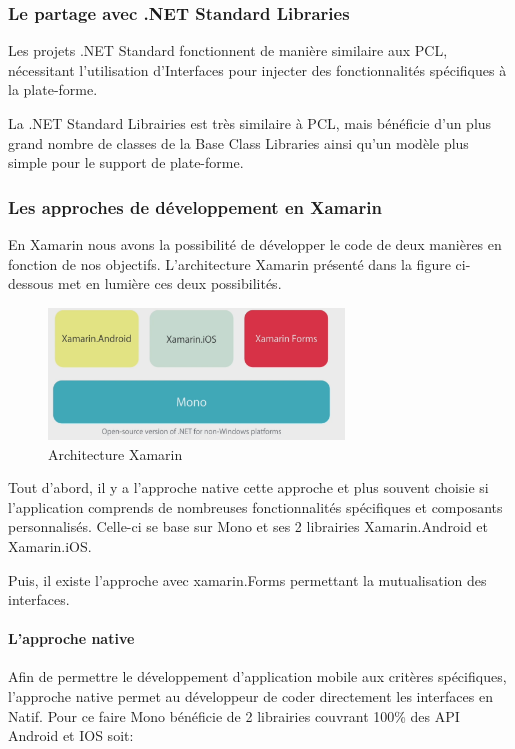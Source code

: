 \documentclass[11]{article}
\begin{document}
\subsubsection{Le partage avec .NET Standard Libraries}
Les projets .NET Standard fonctionnent de manière similaire aux PCL, nécessitant l'utilisation d'Interfaces pour injecter des fonctionnalités spécifiques à la plate-forme.
   
 \vspace{0.5cm}
 
La .NET Standard Librairies est très similaire à PCL, mais bénéficie d’un plus grand nombre de classes de la Base Class Libraries ainsi qu’un modèle plus simple pour le support de plate-forme.


\subsubsection{Les approches de développement en Xamarin}
En Xamarin nous avons la possibilité de développer le code de deux manières en fonction de nos objectifs. L’architecture Xamarin présenté dans la figure ci-dessous met en lumière ces deux possibilités. 

\begin{figure}[h]
    \centering
    \includegraphics[width=0.7\textwidth]{arch-xamarin}
    \caption{Architecture Xamarin}
    \label{bat}
\end{figure}

 \vspace{0.5cm}
 
Tout d’abord, il y a l’approche native cette approche et plus souvent choisie si l’application comprends de nombreuses fonctionnalités spécifiques et composants personnalisés. Celle-ci se base sur Mono et ses 2 librairies Xamarin.Android et Xamarin.iOS.

 \vspace{0.5cm}
 
Puis, il existe l'approche avec xamarin.Forms permettant la mutualisation des interfaces.


\paragraph{L’approche native}
Afin de permettre le développement d’application mobile aux critères spécifiques, l’approche native permet au développeur de coder directement les interfaces en Natif.
Pour ce faire Mono bénéficie de 2 librairies couvrant 100\% des API Android et IOS soit:
\end{document}
